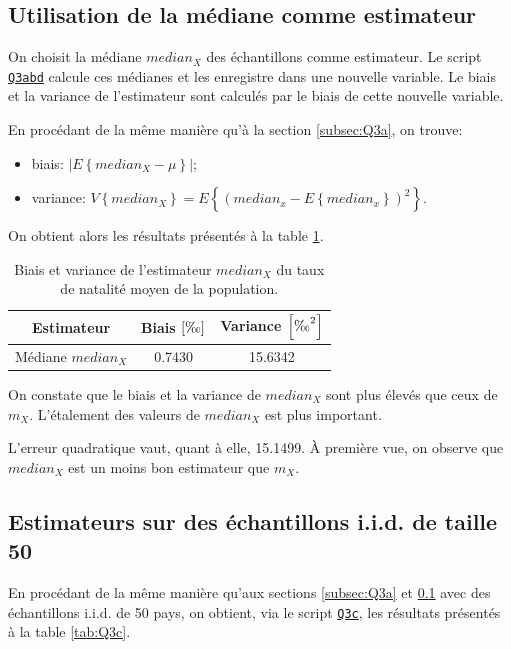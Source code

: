 \documentclass[a4paper, 12pt]{article}
\begin{document}
	\subsection{Utilisation de la médiane comme estimateur}
	\label{subsec:Q3b}
	On choisit la médiane \(median_X\) des échantillons comme estimateur. Le script \hyperref[subsec:code-Q3]{\texttt{Q3abd}} calcule ces médianes et les enregistre dans une nouvelle variable. Le biais et la variance de l'estimateur sont calculés par le biais de cette nouvelle variable.\par
	
	En procédant de la même manière qu'à la section \ref{subsec:Q3a}, on trouve:
	
	\begin{itemize}
	    \item biais: \(\left |E\left\{median_X-\mu\right\}\right |\);
	    \item variance: \(V\left\{median_X\right\} = E\left \{\left (median_x - E\left \{median_x\right\}\right )^2\right \}\).
	\end{itemize}
	
	On obtient alors les résultats présentés à la table \ref{tab:Q3b}.\par
	
	\begin{table}[!ht]
	    \centering
	    \begin{tabular}{|c|c|c|}
	        \hline
	        \textbf{Estimateur} & \textbf{Biais} \(\left [\text{\textperthousand} \right ]\) & \textbf{Variance} \(\left [\text{\textperthousand}^2 \right ]\)\\ \hline
	        \hline
	        Médiane \(median_X\) & \num{0.7430} & \num{15.6342}\\ \hline
	    \end{tabular}
	    \caption{Biais et variance de l'estimateur \(median_X\) du taux de natalité moyen de la population.}
	    \label{tab:Q3b}
	\end{table}
	
	On constate que le biais et la variance de \(median_X\) sont plus élevés que ceux de \(m_X\). L'étalement des valeurs de \(median_X\) est plus important.\par
	
	L'erreur quadratique vaut, quant à elle, \num{15.1499}. À première vue, on observe que \(median_X\) est un moins bon estimateur que \(m_X\).
	
	\subsection{Estimateurs sur des échantillons i.i.d. de taille \num{50}}
	En procédant de la même manière qu'aux sections \ref{subsec:Q3a} et \ref{subsec:Q3b} avec des échantillons i.i.d. de 50 pays, on obtient, via le script \hyperref[subsec:code-Q3]{\texttt{Q3c}}, les résultats présentés à la table \ref{tab:Q3c}.\par
	
\end{document}
